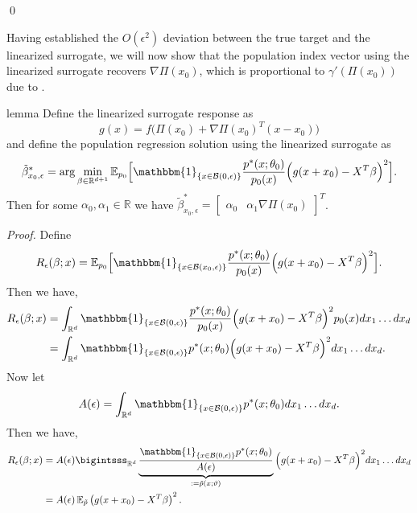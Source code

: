 \documentclass[11pt]{article}
\begin{document}
\qed{}

Having established the $O(\epsilon^2)$ deviation between the true target and the linearized surrogate, we will now show that the population index vector using the linearized surrogate recovers $\nabla\Pi(x_0)$, which is proportional to $\gamma'(\Pi(x_0))$ due to .  

\begin{restatable}[Surrogate]{lemma}{} \label{lemma: surrogate problem} Define the linearized surrogate response as
\[g(x) = f\Big(\Pi(x_0) + \nabla\Pi(x_0)^{T}(x-x_0)\Big)\]
and define the population regression solution using the linearized surrogate as 
\[\tilde{\beta}^*_{x_0, \epsilon} = \arg\min_{\beta \in \mathbb{R}^{d+1}}\mathbb{E}_{ p_{0}}\Big[\mathbbm{1}_{\{x \in \mathcal{B}(0, \epsilon)\}}\frac{p^*(x;\theta_0)}{p_{0}(x)}\Big(g(x + x_0) - X^{T}\beta \Big)^2\Big].\]
Then for some $\alpha_0, \alpha_1 \in \mathbb{R}$ we have $\tilde{\beta}^*_{x_0, \epsilon} = \begin{bmatrix}\alpha_0  & \alpha_1\nabla \Pi(x_0) \end{bmatrix}^T$. 
\end{restatable}
\noindent \textit{Proof.} Define 
\[R_{\epsilon}(\beta; x) = \mathbb{E}_{ p_{0}}\Big[\mathbbm{1}_{\{x \in \mathcal{B}(x_0, \epsilon)\}}\frac{p^*(x;\theta_0)}{p_{0}(x)}\Big(g(x + x_0) - X^{T}\beta\Big)^2\Big].\]
Then we have,
\begin{align*}
    R_{\epsilon}(\beta; x)&= \int_{\mathbb{R}^d}\mathbbm{1}_{\{x \in \mathcal{B}(0, \epsilon)\}}\frac{p^*(x;\theta_0)}{p_{0}(x)}\Big(g(x+x_0) - X^{T}\beta\Big)^2p_{0}(x) dx_1 \dots dx_d \\
    &= \int_{\mathbb{R}^d}\mathbbm{1}_{\{x \in \mathcal{B}(0, \epsilon)\}}p^*(x;\theta_0)\Big(g(x + x_0) - X^{T}\beta \Big)^2 dx_1 \dots dx_d.
\end{align*}
Now let 
\begin{equation}
    A(\epsilon) = \int_{\mathbb{R}^d} \mathbbm{1}_{\{x \in \mathcal{B}(0, \epsilon)\}}p^*(x;\theta_0) dx_1 \dots dx_d.
\end{equation}
Then we have,
\begin{align*}
    R_{\epsilon}(\beta; x)&= A(\epsilon) \bigintsss_{\mathbb{R}^d}\underbrace{\frac{\mathbbm{1}_{\{x \in \mathcal{B}(0, \epsilon)\}}p^*(x;\theta_0)}{A(\epsilon)}}_{:= \tilde{p}(x;\vartheta)}\Big(g(x+x_0) - X^{T}\beta \Big)^2 dx_1 \dots dx_d \\
    &= A(\epsilon)\, \mathbb{E}_{ \tilde{p}}\left(g(x+x_0)-X^{T}\beta\right)^2.
\end{align*}
\end{document}
